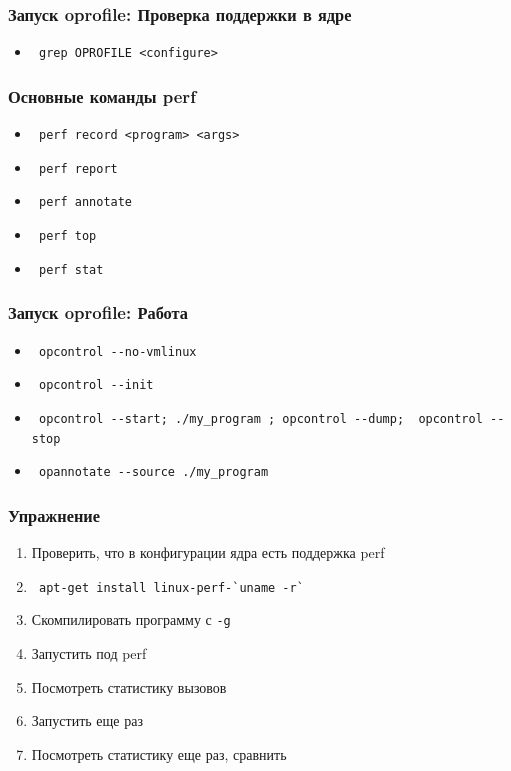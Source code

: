 \begin{frame}[fragile]
 \frametitle{Запуск oprofile: Проверка поддержки в ядре}
 \begin{itemize}
   \item \verb+ grep OPROFILE <configure>+
 \end{itemize}
\end{frame} 

\begin{frame}[fragile]
 \frametitle{Основные команды perf}
 \begin{itemize}
   \item \verb+ perf record <program> <args>+
   \item \verb+ perf report+
   \item \verb+ perf annotate+
   \item \verb+ perf top+
   \item \verb+ perf stat+
 \end{itemize}
\end{frame}

\begin{frame}[fragile]
 \frametitle{Запуск oprofile: Работа}
 \begin{itemize}
  \item \verb+ opcontrol --no-vmlinux+ 
  \item \verb+ opcontrol --init+
  \item \verb+ opcontrol --start; ./my_program ; opcontrol --dump;  opcontrol --stop+
  \item \verb+ opannotate --source ./my_program +
 \end{itemize}
\end{frame}

\begin{frame}[fragile]
 \frametitle{Упражнение}
 \begin{enumerate}
  \item Проверить, что в конфигурации ядра есть поддержка perf
  \item \verb+ apt-get install linux-perf-`uname -r`+
  \item Скомпилировать программу с \texttt{-g}
  \item Запустить под perf
  \item Посмотреть статистику вызовов
  \item Запустить еще раз
  \item Посмотреть статистику еще раз, сравнить
 \end{enumerate}
\end{frame}

